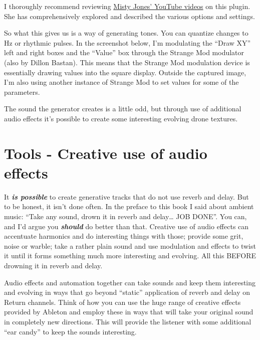 \documentclass[
  12pt,
  letterpaper,
  oneside,
  open=any]{scrbook}
\makeatletter
\newcommand*\pandocbounded[1]{%
  \sbox\pandoc@box{#1}%
  \Gscale@div\@tempa{\textheight}{\dimexpr\ht\pandoc@box+\dp\pandoc@box\relax}%
  \Gscale@div\@tempb{\linewidth}{\wd\pandoc@box}%
  \ifdim\@tempb\p@<\@tempa\p@\let\@tempa\@tempb\fi%
  \ifdim\@tempa\p@<\p@\scalebox{\@tempa}{\usebox\pandoc@box}%
  \else\usebox{\pandoc@box}%
  \fi%
}
\makeatother
\begin{document}
I thoroughly recommend reviewing
\href{https://www.youtube.com/watch?v=dM2ksxavJzI}{Misty Jones' YouTube
videos} on this plugin. She has comprehensively explored and described
the various options and settings.

So what this gives us is a way of generating tones. You can quantize
changes to Hz or rhythmic pulses. In the screenshot below, I'm
modulating the ``Draw XY'' left and right boxes and the ``Value'' box
through the Strange Mod modulator (also by Dillon Bastan). This means
that the Strange Mod modulation device is essentially drawing values
into the square display. Outside the captured image, I'm also using
another instance of Strange Mod to set values for some of the
parameters.

The sound the generator creates is a little odd, but through use of
additional audio effects it's possible to create some interesting
evolving drone textures.

\pandocbounded{\texttt{[image: images/Cellular\_Degradation.png]}}


\chapter{Tools - Creative use of audio
effects}\label{Chapter-015-Tools-Audio_Effects}

It \textbf{\emph{is possible}} to create generative tracks that do not
use reverb and delay. But to be honest, it isn't done often. In the
preface to this book I said about ambient music: ``Take any sound, drown
it in reverb and delay\ldots{} JOB DONE''. You can, and I'd argue you
\textbf{\emph{should}} do better than that. Creative use of audio
effects can accentuate harmonics and do interesting things with those;
provide some grit, noise or warble; take a rather plain sound and use
modulation and effects to twist it until it forms something much more
interesting and evolving. All this BEFORE drowning it in reverb and
delay.

\begin{tcolorbox}[enhanced jigsaw, titlerule=0mm, toprule=.15mm, bottomrule=.15mm, colframe=quarto-callout-tip-color-frame, bottomtitle=1mm, opacityback=0, breakable, leftrule=.75mm, coltitle=black, colback=white, rightrule=.15mm, arc=.35mm, toptitle=1mm, title=\textcolor{quarto-callout-tip-color}{\faLightbulb}\hspace{0.5em}{Key idea}, opacitybacktitle=0.6, left=2mm, colbacktitle=quarto-callout-tip-color!10!white]

Audio effects and automation together can take sounds and keep them
interesting and evolving in ways that go beyond ``static'' application
of reverb and delay on Return channels. Think of how you can use the
huge range of creative effects provided by Ableton and employ these in
ways that will take your original sound in completely new directions.
This will provide the listener with some additional ``ear candy'' to
keep the sounds interesting.

\end{tcolorbox}
\end{document}
